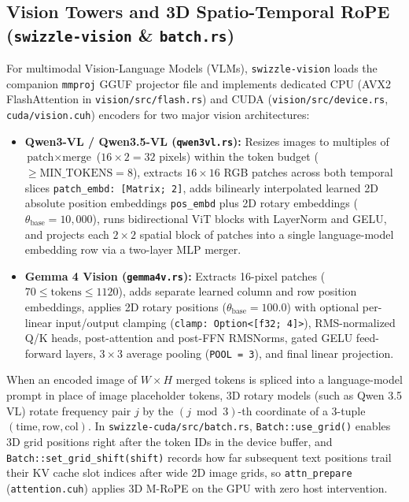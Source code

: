 \documentclass[10pt,a4paper]{article}
\theoremstyle{swzstyle}
\newcommand{\code}[1]{\texttt{#1}}
\begin{document}
\subsection{Vision Towers and 3D Spatio-Temporal RoPE (\texttt{swizzle-vision} \& \texttt{batch.rs})}

For multimodal Vision-Language Models (VLMs), \code{swizzle-vision} loads the companion \code{mmproj} GGUF projector file and implements dedicated CPU (AVX2 FlashAttention in \code{vision/src/flash.rs}) and CUDA (\code{vision/src/device.rs}, \code{cuda/vision.cuh}) encoders for two major vision architectures:
\begin{itemize}
  \item \textbf{Qwen3-VL / Qwen3.5-VL (\code{qwen3vl.rs}):} Resizes images to multiples of $\text{patch} \times \text{merge}$ ($16 \times 2 = 32$ pixels) within the token budget ($\ge \text{MIN\_TOKENS} = 8$), extracts $16\times 16$ RGB patches across both temporal slices \code{patch\_embd: [Matrix; 2]}, adds bilinearly interpolated learned 2D absolute position embeddings \code{pos\_embd} plus 2D rotary embeddings ($\theta_{\text{base}} = 10,000$), runs bidirectional ViT blocks with LayerNorm and GELU, and projects each $2\times 2$ spatial block of patches into a single language-model embedding row via a two-layer MLP merger.
  \item \textbf{Gemma 4 Vision (\code{gemma4v.rs}):} Extracts 16-pixel patches ($70 \le \text{tokens} \le 1120$), adds separate learned column and row position embeddings, applies 2D rotary positions ($\theta_{\text{base}} = 100.0$) with optional per-linear input/output clamping (\code{clamp: Option<[f32; 4]>}), RMS-normalized Q/K heads, post-attention and post-FFN RMSNorms, gated GELU feed-forward layers, $3\times 3$ average pooling (\code{POOL = 3}), and final linear projection.
\end{itemize}

When an encoded image of $W \times H$ merged tokens is spliced into a language-model prompt in place of image placeholder tokens, 3D rotary models (such as Qwen 3.5 VL) rotate frequency pair $j$ by the $(j \bmod 3)$-th coordinate of a 3-tuple $(\text{time}, \text{row}, \text{col})$. In \code{swizzle-cuda/src/batch.rs}, \code{Batch::use\_grid()} enables 3D grid positions right after the token IDs in the device buffer, and \code{Batch::set\_grid\_shift(shift)} records how far subsequent text positions trail their KV cache slot indices after wide 2D image grids, so \code{attn\_prepare} (\code{attention.cuh}) applies 3D M-RoPE on the GPU with zero host intervention.
\end{document}
